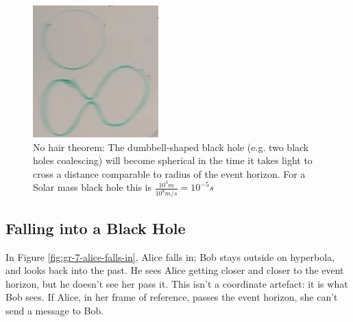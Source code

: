 \documentclass[]{article}
\begin{document}
{ \begin{figure}[H]
	 \begin{center}
	 	\caption[The No Hair Theorem]{No hair theorem: The dumbbell-shaped black hole (e.g. two black holes coalescing) will become spherical in the time it takes light to cross a distance comparable to radius of the event horizon. For a Solar mass black hole this is $\frac{10^3 m}{10^8 m/s}=10^{-5} s$}\label{fig:gr-7-no-hair}
	 	\includegraphics{gr-7-no-hair}
	 \end{center}
 \end{figure}
 
 \subsection{Falling into a Black Hole}
 
 In Figure \ref{fig:gr-7-alice-falls-in}, Alice falls in; Bob stays outside on hyperbola, and looks back into the past. He sees Alice getting closer and closer to the event horizon, but he doesn't see her pass it. This isn't a coordinate artefact: it is what Bob sees. If Alice, in her frame of reference, passes the event horizon, she can't send a message to Bob.
 
}
\end{document}
